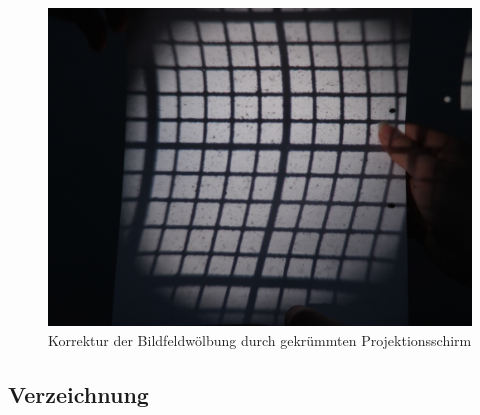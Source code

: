 \begin{figure}[htb]
	\includegraphics[width=\linewidth]{img/Bildwoelbung/Prakt_Linsenfehler_2015_06_04_076}
	\caption{Korrektur der Bildfeldwölbung durch gekrümmten Projektionsschirm}
	\label{fig:bildwoelbung_korrigiert}
\end{figure}

\subsection{Verzeichnung}

